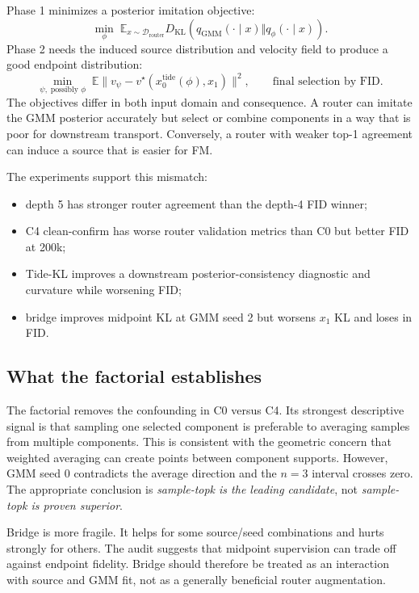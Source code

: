 \documentclass[11pt,a4paper]{article}
\newcommand{\kl}{D_{\mathrm{KL}}}
\begin{document}
Phase 1 minimizes a posterior imitation objective:
\[
 \min_\phi\;
 \mathbb E_{x\sim\mathcal D_{\mathrm{router}}}
 \kl(q_{\mathrm{GMM}}(\cdot\mid x)\Vert q_\phi(\cdot\mid x)).
\]
Phase 2 needs the induced source distribution and velocity field to produce a
good endpoint distribution:
\[
 \min_{\psi,\;\text{possibly }\phi}\;
 \mathbb E\|v_\psi-v^\star(x_0^{\mathrm{tide}}(\phi),x_1)\|^2,
\qquad
\text{final selection by FID}.
\]
The objectives differ in both input domain and consequence. A router can
imitate the GMM posterior accurately but select or combine components in a way
that is poor for downstream transport. Conversely, a router with weaker
top-1 agreement can induce a source that is easier for FM.

The experiments support this mismatch:
\begin{itemize}
  \item depth 5 has stronger router agreement than the depth-4 FID winner;
  \item C4 clean-confirm has worse router validation metrics than C0 but better
  FID at 200k;
  \item Tide-KL improves a downstream posterior-consistency diagnostic and
  curvature while worsening FID;
  \item bridge improves midpoint KL at GMM seed 2 but worsens \(x_1\) KL and
  loses in FID.
\end{itemize}

\subsection{What the factorial establishes}

The factorial removes the confounding in C0 versus C4. Its strongest
descriptive signal is that sampling one selected component is preferable to
averaging samples from multiple components. This is consistent with the
geometric concern that weighted averaging can create points between component
supports. However, GMM seed 0 contradicts the average direction and the
\(n=3\) interval crosses zero. The appropriate conclusion is
\emph{sample-topk is the leading candidate}, not
\emph{sample-topk is proven superior}.

Bridge is more fragile. It helps for some source/seed combinations and hurts
strongly for others. The audit suggests that midpoint supervision can trade
off against endpoint fidelity. Bridge should therefore be treated as an
interaction with source and GMM fit, not as a generally beneficial router
augmentation.
\end{document}
